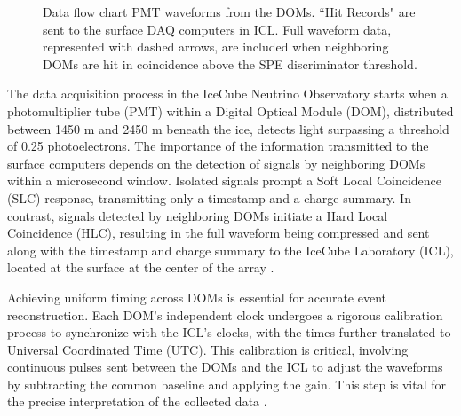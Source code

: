\begin{figure}
    \caption{Data flow chart PMT waveforms from the DOMs. “Hit Records" are sent to the surface DAQ computers in ICL. Full waveform data, represented with dashed arrows, are included when neighboring DOMs are hit in coincidence above the SPE discriminator threshold.}
    \label{fig:IC3_dataflow}
\end{figure}

The data acquisition process in the IceCube Neutrino Observatory starts when a photomultiplier tube (PMT) within a Digital Optical Module (DOM), distributed between 1450 m and 2450 m beneath the ice, detects light surpassing a threshold of 0.25 photoelectrons.
The importance of the information transmitted to the surface computers depends on the detection of signals by neighboring DOMs within a microsecond window.
Isolated signals prompt a Soft Local Coincidence (SLC) response, transmitting only a timestamp and a charge summary.
In contrast, signals detected by neighboring DOMs initiate a Hard Local Coincidence (HLC), resulting in the full waveform being compressed and sent along with the timestamp and charge summary to the IceCube Laboratory (ICL), located at the surface at the center of the array \cite{IC3_thedetector}.

Achieving uniform timing across DOMs is essential for accurate event reconstruction.
Each DOM's independent clock undergoes a rigorous calibration process to synchronize with the ICL's clocks, with the times further translated to Universal Coordinated Time (UTC).
This calibration is critical, involving continuous pulses sent between the DOMs and the ICL to adjust the waveforms by subtracting the common baseline and applying the gain.
This step is vital for the precise interpretation of the collected data \cite{IC3_thedetector}.

